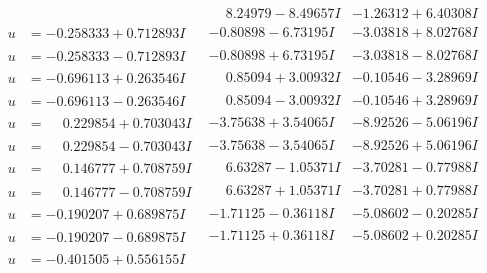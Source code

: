 \documentclass[1p]{elsarticle_modified}
\theoremstyle{definition}
\begin{document}
$$\begin{array}{c|c|c}
 & \phantom{-}8.24979 - 8.49657 I & -1.26312 + 6.40308 I \\ \hline\begin{aligned}
u &= -0.258333 + 0.712893 I\end{aligned}
 & -0.80898 - 6.73195 I & -3.03818 + 8.02768 I \\ \hline\begin{aligned}
u &= -0.258333 - 0.712893 I\end{aligned}
 & -0.80898 + 6.73195 I & -3.03818 - 8.02768 I \\ \hline\begin{aligned}
u &= -0.696113 + 0.263546 I\end{aligned}
 & \phantom{-}0.85094 + 3.00932 I & -0.10546 - 3.28969 I \\ \hline\begin{aligned}
u &= -0.696113 - 0.263546 I\end{aligned}
 & \phantom{-}0.85094 - 3.00932 I & -0.10546 + 3.28969 I \\ \hline\begin{aligned}
u &= \phantom{-}0.229854 + 0.703043 I\end{aligned}
 & -3.75638 + 3.54065 I & -8.92526 - 5.06196 I \\ \hline\begin{aligned}
u &= \phantom{-}0.229854 - 0.703043 I\end{aligned}
 & -3.75638 - 3.54065 I & -8.92526 + 5.06196 I \\ \hline\begin{aligned}
u &= \phantom{-}0.146777 + 0.708759 I\end{aligned}
 & \phantom{-}6.63287 - 1.05371 I & -3.70281 - 0.77988 I \\ \hline\begin{aligned}
u &= \phantom{-}0.146777 - 0.708759 I\end{aligned}
 & \phantom{-}6.63287 + 1.05371 I & -3.70281 + 0.77988 I \\ \hline\begin{aligned}
u &= -0.190207 + 0.689875 I\end{aligned}
 & -1.71125 - 0.36118 I & -5.08602 - 0.20285 I \\ \hline\begin{aligned}
u &= -0.190207 - 0.689875 I\end{aligned}
 & -1.71125 + 0.36118 I & -5.08602 + 0.20285 I \\ \hline\begin{aligned}
u &= -0.401505 + 0.556155 I\end{aligned}

\end{array}$$
\end{document}
